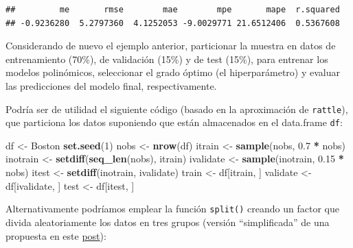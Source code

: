 \documentclass[]{book}
\newenvironment{Shaded}{\begin{snugshade}}{\end{snugshade}}
\newcommand{\KeywordTok}[1]{\textcolor[rgb]{0.13,0.29,0.53}{\textbf{#1}}}
\newcommand{\DecValTok}[1]{\textcolor[rgb]{0.00,0.00,0.81}{#1}}
\newcommand{\FloatTok}[1]{\textcolor[rgb]{0.00,0.00,0.81}{#1}}
\newcommand{\StringTok}[1]{\textcolor[rgb]{0.31,0.60,0.02}{#1}}
\newcommand{\OperatorTok}[1]{\textcolor[rgb]{0.81,0.36,0.00}{\textbf{#1}}}
\newcommand{\NormalTok}[1]{#1}
\theoremstyle{break}
\theoremstyle{definition}
\theoremstyle{definition}
\theoremstyle{definition}
\theoremstyle{remark}
\let\BeginKnitrBlock\begin \let\EndKnitrBlock\end
\begin{document}
\begin{verbatim}
##         me       rmse        mae        mpe       mape  r.squared 
## -0.9236280  5.2797360  4.1252053 -9.0029771 21.6512406  0.5367608
\end{verbatim}

\BeginKnitrBlock{exercise}
\protect\hypertarget{exr:train-validate-test}{}{\label{exr:train-validate-test}
}
\EndKnitrBlock{exercise}

Considerando de nuevo el ejemplo anterior, particionar la muestra en
datos de entrenamiento (70\%), de validación (15\%) y de test (15\%),
para entrenar los modelos polinómicos, seleccionar el grado óptimo (el
hiperparámetro) y evaluar las predicciones del modelo final,
respectivamente.

Podría ser de utilidad el siguiente código (basado en la aproximación de
\texttt{rattle}), que particiona los datos suponiendo que están
almacenados en el data.frame \texttt{df}:

\begin{Shaded}
\begin{Highlighting}[]
\NormalTok{df <-}\StringTok{ }\NormalTok{Boston}
\KeywordTok{set.seed}\NormalTok{(}\DecValTok{1}\NormalTok{)}
\NormalTok{nobs <-}\StringTok{ }\KeywordTok{nrow}\NormalTok{(df)}
\NormalTok{itrain <-}\StringTok{ }\KeywordTok{sample}\NormalTok{(nobs, }\FloatTok{0.7} \OperatorTok{*}\StringTok{ }\NormalTok{nobs)}
\NormalTok{inotrain <-}\StringTok{ }\KeywordTok{setdiff}\NormalTok{(}\KeywordTok{seq_len}\NormalTok{(nobs), itrain)}
\NormalTok{ivalidate <-}\StringTok{ }\KeywordTok{sample}\NormalTok{(inotrain, }\FloatTok{0.15} \OperatorTok{*}\StringTok{ }\NormalTok{nobs)}
\NormalTok{itest <-}\StringTok{ }\KeywordTok{setdiff}\NormalTok{(inotrain, ivalidate)}
\NormalTok{train <-}\StringTok{ }\NormalTok{df[itrain, ]}
\NormalTok{validate <-}\StringTok{ }\NormalTok{df[ivalidate, ]}
\NormalTok{test <-}\StringTok{ }\NormalTok{df[itest, ]}
\end{Highlighting}
\end{Shaded}

Alternativamente podríamos emplear la función \texttt{split()} creando
un factor que divida aleatoriamente los datos en tres grupos (versión
``simplificada'' de una propuesta en este
\href{https://stackoverflow.com/questions/36068963/r-how-to-split-a-data-frame-into-training-validation-and-test-sets}{post}):
\end{document}
